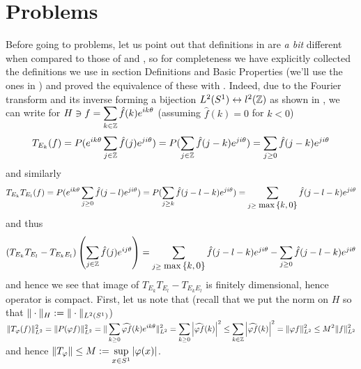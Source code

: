 \documentclass[10pt]{article} %
\begin{document}
\section{Problems}
Before going to problems, let us point out that definitions in \cite{gilkey} are {\it a bit} different when compared to those
of \cite{met-sobolev} and \cite{met-fa}, so for completeness we have explicitly 
collected the definitions we use in section Definitions and
Basic Properties (we'll use the ones in \cite{gilkey}) and proved the equivalence of these with \cite{met-fa,met-sobolev}.
Indeed, due to the Fourier transform and its inverse forming a bijection $L^2(S^1)\leftrightarrow l^2(\mathbb{Z})$ as shown in
\cite{met-fourier}, we can write for $H\ni f=\sum_{ k\in\Z }\hat{ f }(k)e^{ ik\theta }$ (assuming $\hat{ f }(k)=0$ for $k<0$)
\[T_{E_k}(f)=P(e^{ ik\theta} \sum_{ j\in\Z }\hat{ f }(j)e^{ ji\theta })=P(\sum_{ j\in\Z }\hat{ f }(j-k)e^{ ji\theta })=\sum_{ j\geq0}
\hat{ f }(j-k)e^{ ji\theta }\]
and similarly
\[T_{ E_k }T_{E_l}(f)=P(e^{ ik\theta} \sum_{ j\geq0 }\hat{ f }(j-l)e^{ ji\theta })=
P(\sum_{ j\geq k }\hat{ f }(j-l-k)e^{ ji\theta })=\sum_{ j\geq\max\mycbra{ k,0 }} \hat{ f }(j-l-k)e^{ ji\theta }\]
and thus
\[(T_{ E_k }T_{ E_l }-T_{ E_kE_l })\mybra{ \sum_{ j\in\Z }\hat{ f }(j)e^{ ij\theta } }=
\sum_{ j\geq\max\mycbra{ k,0 }} \hat{ f }(j-l-k)e^{ ji\theta }-
\sum_{ j\geq0 } \hat{ f }(j-l-k)e^{ ji\theta }
\]
and hence we see that image of $T_{ E_k }T_{ E_l }-T_{ E_kE_l }$ is finitely dimensional, hence operator is compact.
First, let us note that (recall that we put the norm on $H$ so that $\| \cdot \|_H:=\| \cdot \|_{ L^2(S^1) }$)
$\mynorm{ T_\phi(f) }^2_{ L^2 }=\mynorm{ P(\phi f) }^2_{ L^2 }=\mynorm{ \sum_{ k\geq0}\widehat{ \phi f }(k)
e^{ ik\theta }}^2_{ L^2 }=\sum_{ k\geq0 }\myabs{\widehat{ \phi f }(k)}^2\leq\sum_{ k\in\Z }\myabs{\widehat{ \phi f }(k)}^2=
\mynorm{ \phi f }^2_{ L^2 }\leq M^2\mynorm{ f }^2_{ L^2 }$ and hence $\mynorm{ T_\phi }\leq M:=\sup_{ x\in S^1 }\myabs{ \phi(x) }$.\par
\end{document}
